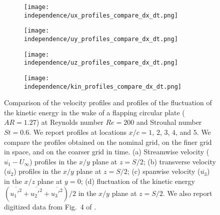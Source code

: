 \begin{figure}[!h]
  \centering
  \begin{subfigure}[c]{0.48\textwidth}
    \centering
    \texttt{[image: independence/ux\_profiles\_compare\_dx\_dt.png]}
    \caption{}
    \label{fig:independence_profiles:streamwise}
  \end{subfigure}
  \begin{subfigure}[c]{0.48\textwidth}
    \centering
    \texttt{[image: independence/uy\_profiles\_compare\_dx\_dt.png]}
    \caption{}
    \label{fig:independence_profiles:transverse}
  \end{subfigure}
  \begin{subfigure}[c]{0.48\textwidth}
    \centering
    \texttt{[image: independence/uz\_profiles\_compare\_dx\_dt.png]}
    \caption{}
    \label{fig:independence_profiles:spanwise}
  \end{subfigure}
  \begin{subfigure}[c]{0.48\textwidth}
    \centering
    \texttt{[image: independence/kin\_profiles\_compare\_dx\_dt.png]}
    \caption{}
    \label{fig:independence_profiles:kinetic}
  \end{subfigure}
  \caption{Comparison of the velocity profiles and profiles of the fluctuation of the kinetic energy in the wake of a flapping circular plate ($AR = 1.27$) at Reynolds number $Re = 200$ and Strouhal number $St = 0.6$. We report profiles at locations $x / c = 1$, $2$, $3$, $4$, and $5$. We compare the profiles obtained on the nominal grid, on the finer grid in space, and on the coarser grid in time. (a) Streamwise velocity ($\overline{u_1} - U_\infty$) profiles in the $x/y$ plane at $z = S / 2$; (b) transverse velocity ($\overline{u_2}$) profiles in the $x/y$ plane at $z = S / 2$; (c) spanwise velocity ($\overline{u_3}$) in the $x/z$ plane at $y = 0$; (d) fluctuation of the kinetic energy $( \overline{{u_1'}^2} + \overline{{u_2'}^2} + \overline{{u_3'}^2} ) / 2$ in the $x/y$ plane at $z = S / 2$. We also report digitized data from Fig.~4 of \citet{li_dong_2016}.}
  \label{fig:independence_profiles}
\end{figure}

